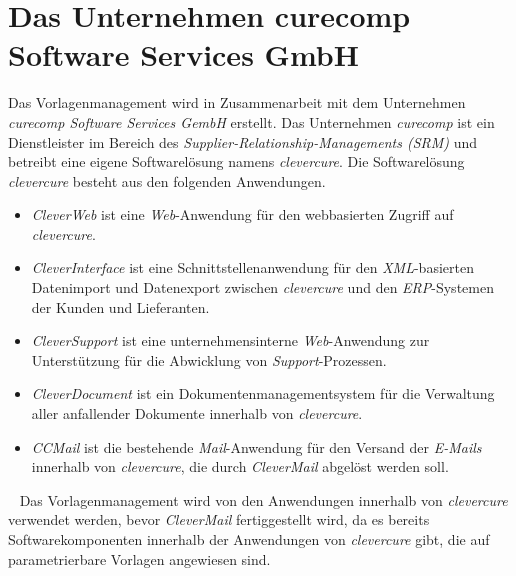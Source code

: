 \section{Das Unternehmen curecomp Software Services GmbH}
Das Vorlagenmanagement wird in Zusammenarbeit mit dem Unternehmen \emph{curecomp Software Services GembH} erstellt. Das Unternehmen \emph{curecomp} ist ein Dienstleister im Bereich des \emph{Supplier-Relationship-Managements (SRM)} und betreibt eine eigene Softwarelösung namens \emph{clevercure}. Die Softwarelösung \emph{clevercure} besteht aus den folgenden Anwendungen.
\newline
\begin{itemize}
	\item\emph{CleverWeb} 
	\newline
	ist eine \emph{Web}-Anwendung für den webbasierten Zugriff auf \emph{clevercure}.
	\item\emph{CleverInterface} 
	\newline
	ist eine Schnittstellenanwendung für den \emph{XML}-basierten Datenimport und Datenexport zwischen \emph{clevercure} und den \emph{ERP}-Systemen der Kunden und Lieferanten.
	\item\emph{CleverSupport} 
	\newline
	ist eine unternehmensinterne \emph{Web}-Anwendung zur Unterstützung für die Abwicklung von \emph{Support}-Prozessen.
	\item\emph{CleverDocument} 
	\newline
	ist ein Dokumentenmanagementsystem für die Verwaltung aller anfallender Dokumente innerhalb von \emph{clevercure}.
	\item\emph{CCMail} 
	\newline
	ist die bestehende \emph{Mail}-Anwendung für den Versand der \emph{E-Mails} innerhalb von \emph{clevercure}, die durch \emph{CleverMail} abgelöst werden soll.
\end{itemize}
\ \newline
Das Vorlagenmanagement wird von den Anwendungen innerhalb von \emph{clevercure} verwendet werden, bevor \emph{CleverMail} fertiggestellt wird, da es bereits Softwarekomponenten innerhalb der Anwendungen von \emph{clevercure} gibt, die auf parametrierbare Vorlagen angewiesen sind.

